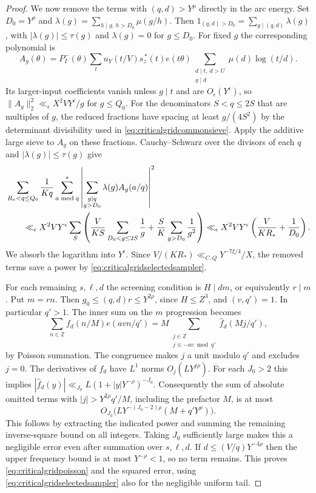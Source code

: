 \documentclass[11pt,a4paper]{article}
\numberwithin{equation}{section}
\begin{document}
\begin{proof}
We now remove the terms with $(q,d)>Y^\rho$ directly
in the arc energy. Set $D_0=Y^\rho$ and
$\lambda(g)=\sum_{h\mid g,\,h>D_0}\mu(g/h)$.
Then $1_{(q,d)>D_0}=\sum_{g\mid(q,d)}\lambda(g)$, with
$|\lambda(g)|\le\tau(g)$ and $\lambda(g)=0$ for $g\le D_0$.
For fixed $g$ the corresponding polynomial is
\[
 A_g(\theta)=P_I^-(\theta)\sum_{t} u_Y(t/V)s_z^{\,*}(t)e(t\theta)
             \sum_{\substack{d\mid t,\ d>U\\g\mid d}}\mu(d)\log(t/d).
\]
Its larger-input coefficients vanish unless $g\mid t$
and are $O_\epsilon(Y^\epsilon)$, so
$\|A_g\|_2^2\ll_\epsilon X^2 VY^\epsilon/g$ for $g\le Q_0$.
For the denominators $S<q\le2S$ that are multiples of $g$,
the reduced fractions have spacing at least $g/(4S^2)$
by the determinant divisibility used in
\cref{eq:criticalgridcommonsieve}. Apply the additive
large sieve to $A_g$ on these fractions.
Cauchy--Schwarz over the divisors of each $q$ and
$|\lambda(g)|\le\tau(g)$ give
\begin{align}
 &\sum_{R_*<q\le Q_0}\frac1{Kq}
  \sum_{a\bmod q}^*
       \left|\sum_{\substack{g\mid q\\g>D_0}}\lambda(g)A_g(a/q)\right|^2
 \notag\\
 &\qquad\ll_\epsilon
 X^2 VY^\epsilon\sum_S
  \left(\frac{V}{KS}\sum_{D_0<g\le2S}\frac1g
             +\frac{S}{K}\sum_{g>D_0}\frac1{g^2}\right)
 \ll_\epsilon X^2 VY^\epsilon
                   \left(\frac{V}{K R_*}+\frac1{D_0}\right).
 \label{eq:criticalgridpoissongcd}
\end{align}
We absorb the logarithm into $Y^\epsilon$.
Since $V/(K R_*)\ll_{C,Q}Y^{-7\xi/4}/X$, the removed
terms save a power by \cref{eq:criticalgridselectedsampler}.

For each remaining $s,\ell,d$ the screening condition is
$H\mid dm$, or equivalently $r\mid m$. Put $m=rn$.
Then $g_0\le(q,d) r\le Y^{2\rho}$, since $H\le Z^3$,
and $(v,q')=1$. In particular $q'>1$. The inner sum on
the $m$ progression becomes
\[
 \sum_{n\in\mathbb Z} f_d(n/M)e(av n/q')
  =M\sum_{\substack{j\in\mathbb Z\\j\equiv-av\bmod q'}}
                  \widehat f_d(Mj/q'),
\]
by Poisson summation. The congruence makes $j$ a unit
modulo $q'$ and excludes $j=0$.
The derivatives of $f_d$ have $L^1$ norms
$O_j(LY^{j\rho})$. For each $J_0>2$ this implies
$|\widehat f_d(y)|\ll_{J_0}L(1+|y|Y^{-\rho})^{-J_0}$.
Consequently the sum of absolute omitted terms with
$|j|>Y^{2\rho}q'/M$, including the prefactor $M$, is
at most
\[
 O_{J_0}\bigl(LY^{-(J_0-2)\rho}(M+q'Y^\rho)\bigr).
\]
This follows by extracting the indicated power
and summing the remaining inverse-square bound on all
integers. Taking $J_0$ sufficiently large makes this a
negligible error even after summation over $s,\ell,d$.
If $d\le(V/q)Y^{-4\rho}$ then the upper frequency bound
is at most $Y^{-\rho}<1$, so no term remains.
This proves \cref{eq:criticalgridpoisson} and the squared
error, using \cref{eq:criticalgridselectedsampler} also for
the negligible uniform tail.


\end{proof}
\end{document}
